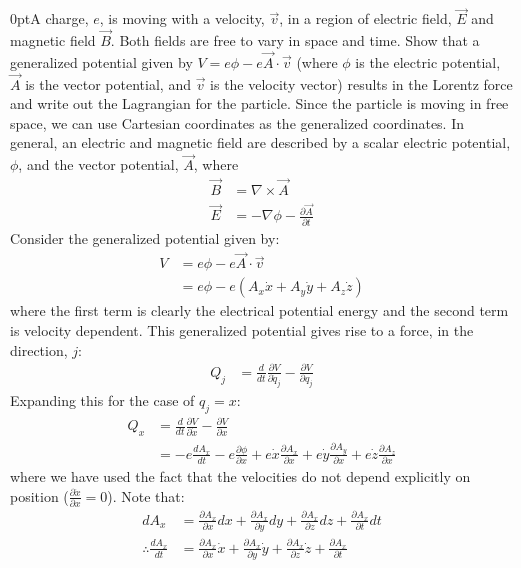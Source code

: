 \begin{example}{0pt}{A charge, $e$, is moving with a velocity, $\vec{v}$, in a region of electric field, $\vec{E}$ and magnetic field $\vec{B}$. Both fields are free to vary in space and time. Show that a generalized potential given by $V=e\phi-e\vec A\cdot \vec v $ (where $\phi$ is the electric potential, $\vec A$ is the vector potential, and $\vec v$ is the velocity vector) results in the Lorentz force and write out the Lagrangian for the particle.}{}
Since the particle is moving in free space, we can use Cartesian coordinates as the generalized coordinates. In general, an electric and magnetic field are described by a scalar electric potential, $\phi$, and the vector potential, $\vec{A}$, where
\begin{align*}
\vec{B}&=\nabla \times \vec{A}\nonumber\\
\vec{E}&=-\nabla\phi-\frac{\partial\vec{A}}{\partial t}
\end{align*} 
Consider the generalized potential given by:
\begin{align*}
V&=e\phi -e\vec{A}\cdot\vec{v}\nonumber\\
&=e\phi-e(A_x\dot{x}+A_y\dot{y}+A_z\dot{z})
\end{align*}
where the first term is clearly the electrical potential energy and the second term is velocity dependent. This generalized potential gives rise to a force, in the direction, $j$:
\begin{align*}
Q_j&=\frac{d}{dt}\frac{\partial V}{\partial \dot{q}_j}-\frac{\partial V}{\partial q_j}
\end{align*}
Expanding this for the case of $q_j=x$:
\begin{align*}
Q_x&=\frac{d}{dt}\frac{\partial V}{\partial \dot{x}}-\frac{\partial V}{\partial x}\nonumber\\
&=-e\frac{dA_x}{dt}-e\frac{\partial\phi}{\partial x}+e\dot{x}\frac{\partial A_x}{\partial x}+e\dot{y}\frac{\partial A_y}{\partial x}+e\dot{z}\frac{\partial A_z}{\partial x}
\end{align*}
where we have used the fact that the velocities do not depend explicitly on position ($\frac{\partial \dot{x}}{\partial x}=0$). Note that:
\begin{align*}
dA_x&=\frac{\partial A_x}{\partial x}dx+\frac{\partial A_x}{\partial y}dy+\frac{\partial A_x}{\partial z}dz+\frac{\partial A_x}{\partial t}dt\\
\therefore \frac{dA_x}{dt} &=\frac{\partial A_x}{\partial x}\dot{x}+\frac{\partial A_x}{\partial y}\dot{y}+\frac{\partial A_x}{\partial z}\dot{z}+\frac{\partial A_x}{\partial t}

\end{align*}
\end{example}
